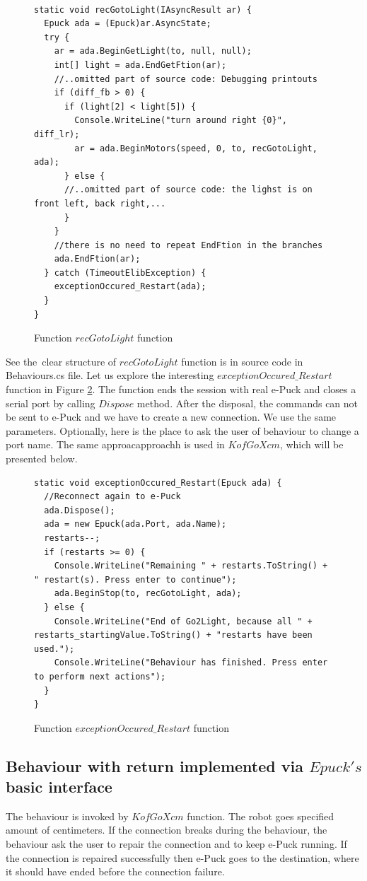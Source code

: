 \begin{figure}[!hbp]
\begin{lstlisting}
  
static void recGotoLight(IAsyncResult ar) {
  Epuck ada = (Epuck)ar.AsyncState;
  try {
    ar = ada.BeginGetLight(to, null, null);
    int[] light = ada.EndGetFtion(ar);
    //..omitted part of source code: Debugging printouts
    if (diff_fb > 0) {
      if (light[2] < light[5]) {
        Console.WriteLine("turn around right {0}", diff_lr);
        ar = ada.BeginMotors(speed, 0, to, recGotoLight, ada);
      } else {
      //..omitted part of source code: the lighst is on front left, back right,...
      }
    }
    //there is no need to repeat EndFtion in the branches
    ada.EndFtion(ar);
  } catch (TimeoutElibException) {
    exceptionOccured_Restart(ada);
  }
}
\end{lstlisting}
\caption{Function $recGotoLight$ function} \label{go2light}
\end{figure}
  See the~clear structure of $recGotoLight$ function is in source code in Behaviours.cs file. 
  Let us explore the interesting $exceptionOccured\_Restart$ function in Figure \ref{restart}.
  The function ends the session with real e-Puck and closes a serial port by calling $Dispose$ method.
  After the disposal, the commands can not be sent to e-Puck and we have to create a new connection. We use the same parameters.
  Optionally, here is the place to ask the user of behaviour to change a port name.
  The same approacapproachh is used in $KofGoXcm$, which will be presented below.
\begin{figure}[!hbp]
\begin{lstlisting}
static void exceptionOccured_Restart(Epuck ada) {
  //Reconnect again to e-Puck
  ada.Dispose();
  ada = new Epuck(ada.Port, ada.Name);
  restarts--;
  if (restarts >= 0) {
    Console.WriteLine("Remaining " + restarts.ToString() + " restart(s). Press enter to continue");
    ada.BeginStop(to, recGotoLight, ada);
  } else {
    Console.WriteLine("End of Go2Light, because all " + restarts_startingValue.ToString() + "restarts have been used.");
    Console.WriteLine("Behaviour has finished. Press enter to perform next actions");
  }
}
\end{lstlisting}
\caption{Function $exceptionOccured\_Restart$ function} \label{restart}
\end{figure}

\subsection{Behaviour with return implemented via $Epuck's$ basic interface}\label{sec:kofgoxcm}
  The behaviour is invoked by $KofGoXcm$ function. 
  The robot goes specified amount of centimeters. 
  If the connection breaks during the behaviour, 
  the behaviour ask the user to repair the connection and to keep e-Puck running. 
  If the connection is repaired successfully then e-Puck goes to the destination, 
  where it should have ended before the connection failure.

